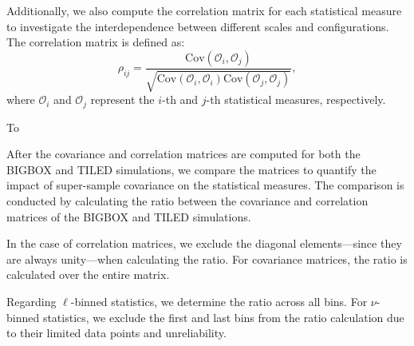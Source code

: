 Additionally, we also compute the correlation matrix for each statistical measure to investigate the interdependence between different scales and configurations. The correlation matrix is defined as:
\begin{equation}
    \rho_{ij} = \frac{\text{Cov}(\mathcal{O}_i, \mathcal{O}_j)}{\sqrt{\text{Cov}(\mathcal{O}_i, \mathcal{O}_i)\text{Cov}(\mathcal{O}_j, \mathcal{O}_j)}},
\end{equation}
where $\mathcal{O}_i$ and $\mathcal{O}_j$ represent the $i$-th and $j$-th statistical measures, respectively.

To 

After the covariance and correlation matrices are computed for both the BIGBOX and TILED simulations, we compare the matrices to quantify the impact of super-sample covariance on the statistical measures. The comparison is conducted by calculating the ratio between the covariance and correlation matrices of the BIGBOX and TILED simulations. 

In the case of correlation matrices, we exclude the diagonal elements---since they are always unity---when calculating the ratio. For covariance matrices, the ratio is calculated over the entire matrix. 

Regarding $\ell$-binned statistics, we determine the ratio across all bins. For $\nu$-binned statistics, we exclude the first and last bins from the ratio calculation due to their limited data points and unreliability.